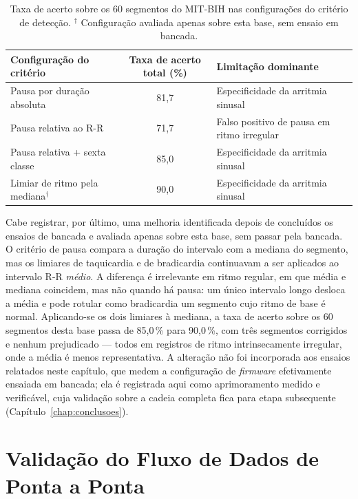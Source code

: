\begin{table}[htb]
\centering
\caption{Taxa de acerto sobre os 60 segmentos do MIT-BIH nas configurações do critério de detecção. $^{\dagger}$ Configuração avaliada apenas sobre esta base, sem ensaio em bancada.}
\label{tab:mitbihConfig}
\begin{tabular}{@{}l c p{6.2cm}@{}}
\hline
\textbf{Configuração do critério} & \textbf{Taxa de acerto total (\%)} & \textbf{Limitação dominante} \\
\hline
Pausa por duração absoluta    & 81,7 & Especificidade da arritmia sinusal \\
Pausa relativa ao R-R         & 71,7 & Falso positivo de pausa em ritmo irregular \\
Pausa relativa + sexta classe & 85,0 & Especificidade da arritmia sinusal \\
Limiar de ritmo pela mediana$^{\dagger}$ & 90,0 & Especificidade da arritmia sinusal \\
\hline
\end{tabular}
\end{table}


Cabe registrar, por último, uma melhoria identificada depois de concluídos os ensaios de bancada e
avaliada apenas sobre esta base, sem passar pela bancada. O critério de pausa compara a
duração do intervalo com a mediana do segmento, mas os limiares de taquicardia e de
bradicardia continuavam a ser aplicados ao intervalo R-R \emph{médio}. A diferença é
irrelevante em ritmo regular, em que média e mediana coincidem, mas não quando há pausa: um
único intervalo longo desloca a média e pode rotular como bradicardia um segmento cujo ritmo
de base é normal. Aplicando-se os dois limiares à mediana, a taxa de acerto sobre os 60
segmentos desta base passa de 85,0\,\% para 90,0\,\%, com três segmentos corrigidos e nenhum
prejudicado --- todos em registros de ritmo intrinsecamente irregular, onde a média é menos
representativa. A alteração não foi incorporada aos ensaios relatados neste capítulo, que
medem a configuração de \textit{firmware} efetivamente ensaiada em bancada; ela é registrada
aqui como aprimoramento medido e verificável, cuja validação sobre a cadeia completa fica
para etapa subsequente (Capítulo~\ref{chap:conclusoes}).


\section{Validação do Fluxo de Dados de Ponta a Ponta}
\label{sec:resPipeline}

